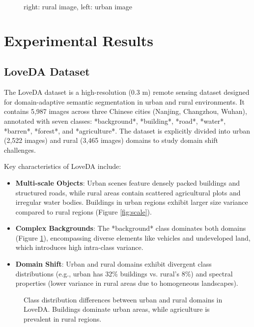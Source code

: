 \documentclass{article}
\begin{document}
\begin{multicols}{2}
\begin{figure}[H]
			\caption{right: rural image, left: urban image }

		\end{figure}


		\section{Experimental Results}
	

		\subsection{LoveDA Dataset}  
		The LoveDA dataset \cite{loveda2021} is a high-resolution (0.3 m) remote sensing dataset designed for domain-adaptive semantic segmentation in urban and rural environments. It contains 5,987 images across three Chinese cities (Nanjing, Changzhou, Wuhan), annotated with seven classes: *background*, *building*, *road*, *water*, *barren*, *forest*, and *agriculture*. The dataset is explicitly divided into urban (2,522 images) and rural (3,465 images) domains to study domain shift challenges.  
		
		Key characteristics of LoveDA include:  
		\begin{itemize}  
			\item \textbf{Multi-scale Objects}: Urban scenes feature densely packed buildings and structured roads, while rural areas contain scattered agricultural plots and irregular water bodies. Buildings in urban regions exhibit larger size variance compared to rural regions (Figure \ref{fig:scale}).  
			\item \textbf{Complex Backgrounds}: The *background* class dominates both domains (Figure \ref{fig:class_dist}), encompassing diverse elements like vehicles and undeveloped land, which introduces high intra-class variance.  
			\item \textbf{Domain Shift}: Urban and rural domains exhibit divergent class distributions (e.g., urban has 32\% buildings vs. rural’s 8\%) and spectral properties (lower variance in rural areas due to homogeneous landscapes).  
		\end{itemize}  
		
		\begin{figure}[ht]  
			\begin{center}

			\caption{Class distribution differences between urban and rural domains in LoveDA. Buildings dominate urban areas, while agriculture is prevalent in rural regions.}  
			\label{fig:class_dist} 
			\end{center} 


\end{figure}
\end{multicols}
\end{document}

